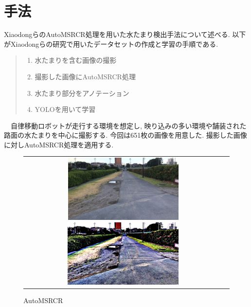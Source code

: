 \documentclass[10pt]{jarticle}
\begin{document}
    \section{手法}%
        XiaodongらのAutoMSRCR処理を用いた水たまり検出手法について述べる. 
    以下がXiaodongらの研究で用いたデータセットの作成と学習の手順である. 
    \begin{quote}
        \begin{enumerate}
         \item 水たまりを含む画像の撮影
         \item 撮影した画像にAutoMSRCR処理
         \item 水たまり部分をアノテーション
         \item YOLOを用いて学習
        \end{enumerate}
       \end{quote}
    　自律移動ロボットが走行する環境を想定し, 
    映り込みの多い環境や舗装された路面の水たまりを中心に撮影する. 今回は651枚の画像を用意した. 
    撮影した画像に対しAutoMSRCR処理を適用する. 
    \begin{figure}[H]
        \begin{tabular}{cc}
            \begin{minipage}{.1\textwidth}
                \centering
                \includegraphics[width=2.0\linewidth]{./fig/fig1.png}
                \vspace{-10mm}\caption{Original}
                \label{fig_first}
            \end{minipage}
            \begin{minipage}{.5\textwidth}
                \centering
                \includegraphics[width=0.4\linewidth]{./fig/fig2.png}
                \vspace{-5mm}\caption{AutoMSRCR}
                \label{fig_second}
            \end{minipage}
        \end{tabular}
    \end{figure}
\end{document}
